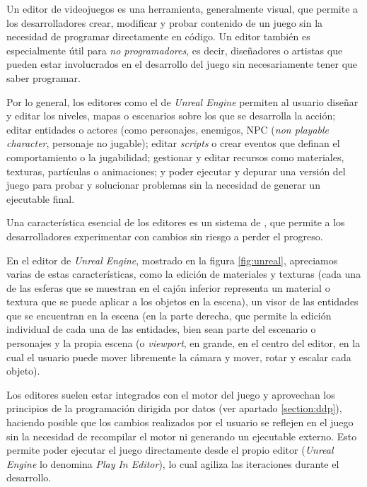 
Un editor de videojuegos es una herramienta, generalmente visual, que permite a los desarrolladores crear, modificar y probar contenido de un juego sin la necesidad de programar directamente en código. Un editor también es especialmente útil para \textit{no programadores}, es decir, diseñadores o artistas que pueden estar involucrados en el desarrollo del juego sin necesariamente tener que saber programar.

\medskip

Por lo general, los editores como el de \textit{Unreal Engine} permiten al usuario diseñar y editar los niveles, mapas o escenarios sobre los que se desarrolla la acción; editar entidades o actores (como personajes, enemigos, NPC (\textit{non playable character}, personaje no jugable); editar \textit{scripts} o crear eventos que definan el comportamiento o la jugabilidad; gestionar y editar recursos como materiales, texturas, partículas o animaciones; y poder ejecutar y depurar una versión del juego para probar y solucionar problemas sin la necesidad de generar un ejecutable final.

\smallskip

Una característica esencial de los editores es un sistema de , que permite a los desarrolladores experimentar con cambios sin riesgo a perder el progreso.

\medskip

En el editor de \textit{Unreal Engine}, mostrado en la figura \ref{fig:unreal}, apreciamos varias de estas características, como la edición de materiales y texturas (cada una de las esferas que se muestran en el cajón inferior representa un material o textura que se puede aplicar a los objetos en la escena), un visor de las entidades que se encuentran en la escena (en la parte derecha, que permite la edición individual de cada una de las entidades, bien sean parte del escenario o personajes y la propia escena (o \textit{viewport}, en grande, en el centro del editor, en la cual el usuario puede mover libremente la cámara y mover, rotar y escalar cada objeto).

\medskip

Los editores suelen estar integrados con el motor del juego y aprovechan los principios de la programación dirigida por datos (ver apartado \ref{section:ddp}), haciendo posible que los cambios realizados por el usuario se reflejen en el juego sin la necesidad de recompilar el motor ni generando un ejecutable externo. Esto permite poder ejecutar el juego directamente desde el propio editor (\textit{Unreal Engine} lo denomina \textit{Play In Editor}), lo cual agiliza las iteraciones durante el desarrollo.

